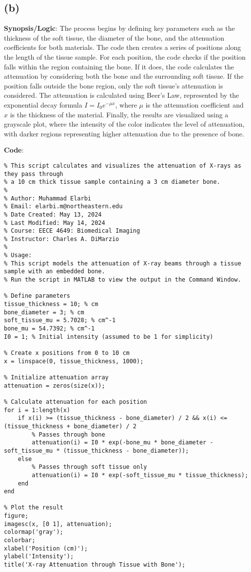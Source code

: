 \documentclass[12pt]{article}
\begin{document}
\subsection*{(b)}
\textbf{Synopsis/Logic}:
The process begins by defining key parameters such as the thickness of the soft tissue, the diameter of the bone, and the attenuation coefficients for both materials. The code then creates a series of positions along the length of the tissue sample. For each position, the code checks if the position falls within the region containing the bone. If it does, the code calculates the attenuation by considering both the bone and the surrounding soft tissue. If the position falls outside the bone region, only the soft tissue's attenuation is considered. The attenuation is calculated using Beer's Law, represented by the exponential decay formula \( I = I_0 e^{-\mu x} \), where \( \mu \) is the attenuation coefficient and \( x \) is the thickness of the material. Finally, the results are visualized using a grayscale plot, where the intensity of the color indicates the level of attenuation, with darker regions representing higher attenuation due to the presence of bone.


\textbf{Code}:

\begin{lstlisting}[style=Matlab-editor]
% X-ray Attenuation through Tissue with Bone
% This script calculates and visualizes the attenuation of X-rays as they pass through
% a 10 cm thick tissue sample containing a 3 cm diameter bone.
%
% Author: Muhammad Elarbi
% Email: elarbi.m@northeastern.edu
% Date Created: May 13, 2024
% Last Modified: May 14, 2024
% Course: EECE 4649: Biomedical Imaging
% Instructor: Charles A. DiMarzio
%
% Usage:
% This script models the attenuation of X-ray beams through a tissue sample with an embedded bone.
% Run the script in MATLAB to view the output in the Command Window.

% Define parameters
tissue_thickness = 10; % cm
bone_diameter = 3; % cm
soft_tissue_mu = 5.7028; % cm^-1
bone_mu = 54.7392; % cm^-1
I0 = 1; % Initial intensity (assumed to be 1 for simplicity)

% Create x positions from 0 to 10 cm
x = linspace(0, tissue_thickness, 1000);

% Initialize attenuation array
attenuation = zeros(size(x));

% Calculate attenuation for each position
for i = 1:length(x)
    if x(i) >= (tissue_thickness - bone_diameter) / 2 && x(i) <= (tissue_thickness + bone_diameter) / 2
        % Passes through bone
        attenuation(i) = I0 * exp(-bone_mu * bone_diameter - soft_tissue_mu * (tissue_thickness - bone_diameter));
    else
        % Passes through soft tissue only
        attenuation(i) = I0 * exp(-soft_tissue_mu * tissue_thickness);
    end
end

% Plot the result
figure;
imagesc(x, [0 1], attenuation);
colormap('gray');
colorbar;
xlabel('Position (cm)');
ylabel('Intensity');
title('X-ray Attenuation through Tissue with Bone');
\end{lstlisting}
\end{document}
